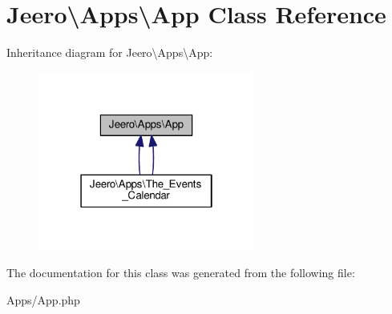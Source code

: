 \hypertarget{classJeero_1_1Apps_1_1App}{}\section{Jeero\textbackslash{}Apps\textbackslash{}App Class Reference}
\label{classJeero_1_1Apps_1_1App}


Inheritance diagram for Jeero\textbackslash{}Apps\textbackslash{}App\+:\nopagebreak
\begin{figure}[H]
\begin{center}
\leavevmode
\includegraphics[width=202pt]{classJeero_1_1Apps_1_1App__inherit__graph}
\end{center}
\end{figure}


The documentation for this class was generated from the following file\+:\begin{DoxyCompactItemize}
\item 
Apps/App.\+php\end{DoxyCompactItemize}
